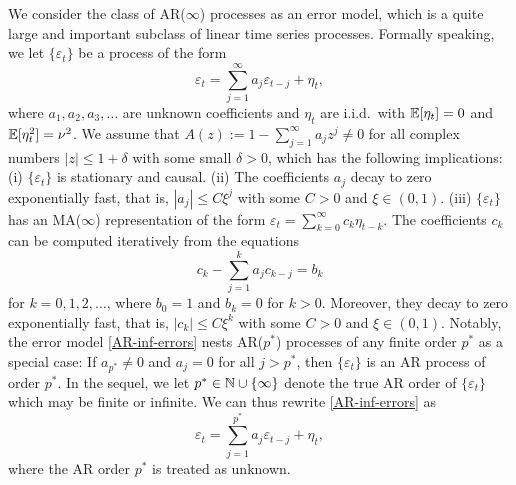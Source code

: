 We consider the class of AR($\infty$) processes as an error model, which is a quite large and important subclass of linear time series processes. Formally speaking, we let $\{\varepsilon_t\}$ be a process of the form 
\begin{equation}\label{AR-inf-errors} 
\varepsilon_t = \sum_{j=1}^\infty a_j \varepsilon_{t-j} + \eta_t, 
\end{equation} 
where $a_1,a_2,a_3,\ldots$ are unknown coefficients and $\eta_t$ are i.i.d.\ with $\mathbb{E}[\eta_t] = 0$ and $\mathbb{E}[\eta_t^2] = \nu^2$. We assume that $A(z) := 1 - \sum_{j=1}^{\infty} a_j z^j \ne 0$ for all complex numbers $|z| \le 1 + \delta$ with some small $\delta > 0$, which has the following implications: (i) $\{ \varepsilon_t \}$ is stationary and causal. (ii) The coefficients $a_j$ decay to zero exponentially fast, that is, $|a_j| \le C \xi^j$ with some $C > 0$ and $\xi \in (0,1)$. (iii) $\{ \varepsilon_t\}$ has an MA($\infty$) representation of the form $\varepsilon_t =  \sum_{k=0}^\infty c_k \eta_{t-k}$. The coefficients $c_k$ can be computed iteratively from the equations  
\begin{equation}\label{c-recursion}
c_k - \sum_{j=1}^k a_j c_{k-j} = b_k 
\end{equation}
for $k = 0,1,2,\ldots$, where $b_0 = 1$ and $b_k = 0$ for $k > 0$. Moreover, they decay to zero exponentially fast, that is, $|c_k| \le C \xi^k$ with some $C > 0$ and $\xi \in (0,1)$. Notably, the error model \eqref{AR-inf-errors} nests AR($p^*$) processes of any finite order $p^*$ as a special case: If $a_{p^*} \ne 0$ and $a_j = 0$ for all $j > p^*$, then $\{ \varepsilon_t \}$ is an AR process of order $p^*$. In the sequel, we let $p^* \in \mathbb{N} \cup \{ \infty \}$ denote the true AR order of $\{\varepsilon_t\}$ which may be finite or infinite. We can thus rewrite \eqref{AR-inf-errors} as 
\begin{equation}\label{AR-errors} 
\varepsilon_t = \sum_{j=1}^{p^*} a_j \varepsilon_{t-j} + \eta_t, 
\end{equation} 
where the AR order $p^*$ is treated as unknown. 



